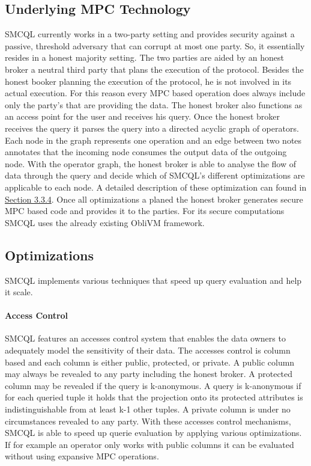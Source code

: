 \subsection{Underlying MPC Technology}
SMCQL currently works in a two-party setting and provides security against a passive, threshold adversary that can corrupt at most one party.  So, it essentially resides in a honest majority setting. The two parties are aided by an honest broker a neutral third party that plans the execution of the protocol. Besides the honest booker planning the execution of the protocol, he is not involved in its actual execution. For this reason every MPC based operation does always include only the party's that are providing the data.
The honest broker also functions as an access point for the user and receives his query. 
Once the honest broker receives the query it parses the query into a directed acyclic graph of operators. Each node in the graph represents one operation and an edge between two notes annotates that the incoming node consumes the output data of the outgoing node. With the operator graph, the honest broker is able to analyse the flow of data through the query and decide which of SMCQL's different optimizations are applicable to each node. 
A detailed description of these optimization can found in \hyperref[sec:Optimizations_smcql]{Section 3.3.4}. Once all optimizations a planed the honest broker generates secure MPC based code and provides it to the parties. For its secure computations SMCQL uses the already existing ObliVM framework.

	



\label{sec:Optimizations_smcql}
\subsection{Optimizations}
SMCQL implements various techniques that speed up query evaluation and help it scale. 
\label{Accesses_label}
\paragraph{Access Control}
SMCQL features an accesses control system that enables the data owners to adequately model the sensitivity of their data. 
The accesses control is column based and each column is either public, protected, or private. 
A public column may always be revealed to any party including the honest broker. A protected column may be revealed if the query is k-anonymous. A query is k-anonymous if for each queried tuple it holds that the projection onto its protected attributes is indistinguishable from at least k-1 other tuples. A private column is under no circumstances revealed to any party. With these accesses control mechanisms, SMCQL is able to speed up querie evaluation by applying various optimizations. If for example an operator only works with public columns it can be evaluated without using expansive MPC operations.
